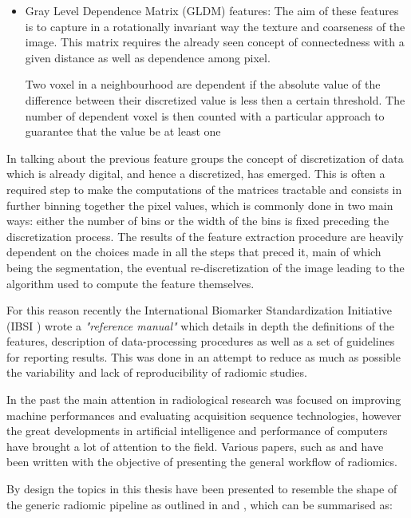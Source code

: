 \begin{enumerate}
\begin{itemize}
		\item Gray Level Dependence Matrix (GLDM) features: The aim of these features is to capture in a rotationally invariant way the texture and coarseness of the image. This matrix requires the already seen concept of connectedness with a given distance as well as dependence among pixel.

Two voxel in a neighbourhood are dependent if the absolute value of the difference between their discretized value is less then a certain threshold. The number of dependent voxel is then counted with a particular approach to guarantee that the value be at least one
	\end{itemize}
\end{enumerate}

In talking about the previous feature groups the concept of discretization of data which is already digital, and hence a discretized, has emerged. This is often a required step to make the computations of the matrices tractable and consists in further binning together the pixel values, which is commonly done in two main ways: either the number of bins or the width of the bins is fixed preceding the discretization process.
The results of the feature extraction procedure are heavily dependent on the choices made in all the steps that preced it, main of which being the segmentation, the eventual re-discretization of the image leading to the algorithm used to compute the feature themselves.

For this reason recently the International Biomarker Standardization Initiative (IBSI \cite{IBSI}) wrote a \textit{"reference manual"} which details in depth the definitions of the features, description of data-processing procedures as well as a set of guidelines for reporting results. This was done in an attempt to reduce as much as possible the variability and lack of reproducibility of radiomic studies.

In the past the main attention in radiological research was focused on improving machine performances and evaluating acquisition sequence technologies, however the great developments in artificial intelligence and performance of computers have brought a lot of attention to the field. Various papers, such as \cite{Rad_review} and \cite{Rad_review_ger} have been written with the objective of presenting the general workflow of radiomics. 

By design the topics in this thesis have been presented to resemble the shape of the generic radiomic pipeline as outlined in \cite{Rad_review} and \cite{Rad_review_ger}, which can be summarised as:

